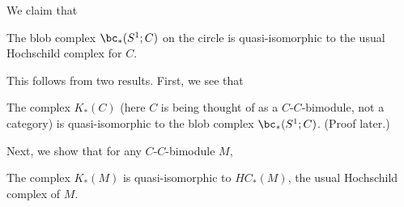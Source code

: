 We claim that
\begin{thm} \label{hochthm}
The blob complex $\bc_*(S^1; C)$ on the circle is quasi-isomorphic to the
usual Hochschild complex for $C$.
\end{thm}

This follows from two results. First, we see that
\begin{lem}
\label{lem:module-blob}%
The complex $K_*(C)$ (here $C$ is being thought of as a
$C$-$C$-bimodule, not a category) is quasi-isomorphic to the blob complex
$\bc_*(S^1; C)$. (Proof later.)
\end{lem}

Next, we show that for any $C$-$C$-bimodule $M$,
\begin{prop} \label{prop:hoch}
The complex $K_*(M)$ is quasi-isomorphic to $HC_*(M)$, the usual
Hochschild complex of $M$.
\end{prop}
